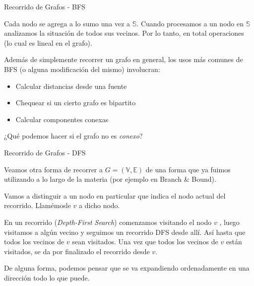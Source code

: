 \documentclass[10pt,hyperref={colorlinks = true,linkcolor = blue}, aspectratio=169]{beamer}
\newcommand \anchoPagina{1.0} %
\begin{document}
\begin{frame}{Recorrido de Grafos - BFS}
    \begin{minipage}{\anchoPagina \textwidth}
        Cada nodo se agrega a lo sumo una vez a $\mathbb{S}$. Cuando procesamos a un nodo en $\mathbb{S}$
        analizamos la situación de todos sus vecinos. Por lo tanto, en total  operaciones (lo cual es lineal en el grafo).
        \pause

        Adem\'as de simplemente recorrer un grafo en general, los usos m\'as comunes de BFS (o alguna modificaci\'
        on del mismo) involucran:
        \pause
        \begin{itemize}
            \item Calcular distancias desde una fuente
            \pause
            \item Chequear si un cierto grafo es bipartito
            \pause
            \item Calcular componentes conexas
        \end{itemize}
        \pause
        ¿Qué podemos hacer si el grafo no es \textit{conexo}?
    \end{minipage}
\end{frame}

\begin{frame}{Recorrido de Grafos - DFS}
    \begin{minipage}{\anchoPagina \textwidth}
        Veamos otra forma de recorrer a $G = (\mathbb{V},\mathbb{E})$
        de una forma que ya fuimos utilizando a lo largo de la materia (por ejemplo en Branch \& Bound).
        \pause

        Vamos a distinguir a un nodo en particular que indica el nodo actual del recorrido. Llamémosle $v$
        a dicho nodo.

        \pause
        En un recorrido  (\textit{Depth-First Search}) comenzamos visitando el nodo $v$
        , luego visitamos a alg\'un vecino y seguimos un recorrido DFS desde allí. As\'
        i hasta que todos los vecinos de $v$ sean visitados. Una vez que todos los vecinos de $v$ están
        visitados, se da por finalizado el recorrido desde $v$.
        \pause

        De alguna forma, podemos pensar que se va expandiendo ordenadamente en una dirección todo lo que puede.

    \end{minipage}

\end{frame}
\end{document}
